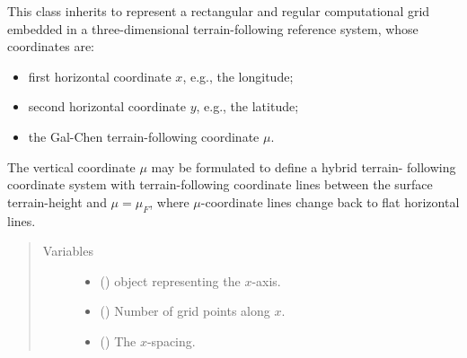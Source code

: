 \documentclass[letterpaper,10pt,english]{sphinxmanual}
\begin{document}
\begin{fulllineitems}
\label{\detokenize{api:grids.gal_chen.GalChen3d}}
This class inherits {\hyperref[\detokenize{api:grids.xyz_grid.XYZGrid}]{}} to represent a rectangular and regular
computational grid embedded in a three-dimensional terrain-following reference system, whose
coordinates are:
\begin{itemize}
\item {} 
first horizontal coordinate \(x\), e.g., the longitude;

\item {} 
second horizontal coordinate \(y\), e.g., the latitude;

\item {} 
the Gal-Chen terrain-following coordinate \(\mu\).

\end{itemize}

The vertical coordinate \(\mu\) may be formulated to define a hybrid terrain-
following coordinate system with terrain-following coordinate lines between the
surface terrain-height and \(\mu = \mu_F\), where \(\mu\)-coordinate
lines change back to flat horizontal lines.
\begin{quote}\begin{description}
\item[{Variables}] \leavevmode\begin{itemize}
\item {} 
{\hyperref[\detokenize{api:grids.xyz_grid.XYZGrid.x}]{}} () \textendash{} {\hyperref[\detokenize{api:grids.axis.Axis}]{}} object representing the \(x\)-axis.

\item {} 
{\hyperref[\detokenize{api:grids.xyz_grid.XYZGrid.nx}]{}} () \textendash{} Number of grid points along \(x\).

\item {} 
{\hyperref[\detokenize{api:grids.xyz_grid.XYZGrid.dx}]{}} () \textendash{} The \(x\)-spacing.


\end{itemize}
\end{description}
\end{quote}
\end{fulllineitems}
\end{document}
